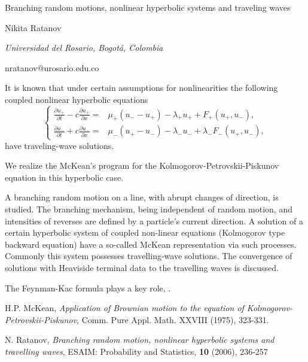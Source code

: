 \documentclass[10pt,a4paper]{article}
\begin{document}
\begin{center}

{\Large Branching random motions, nonlinear hyperbolic systems and traveling waves}

\bigskip

{\sc Nikita Ratanov}

{\small\it Universidad del Rosario, Bogot\'a, Colombia}

{\small\rm nratanov@urosario.edu.co}

\end{center}

\bigskip
It is known that under certain assumptions for nonlinearities the 
following coupled nonlinear hyperbolic equations
\[
\left\{
\begin{aligned}
\frac{\partial u_+}{\partial t}-c\frac{\partial u_+}{\partial x}
=&\mu_+(u_--u_+)-\lambda_+u_++F_+(u_+, u_-),\\
\frac{\partial u_-}{\partial t}+c\frac{\partial u_-}{\partial x}
=&\mu_-(u_+-u_-)-\lambda_-u_-+\lambda_-F_-(u_+, u_-),
\end{aligned}
\right.
\]
have traveling-wave solutions. 

We realize the McKean's program \cite{McK323} for the 
Kolmogorov-Petrovskii-Piskunov equation in this hyperbolic case. 

A branching random motion on a line, 
with abrupt changes of direction, is studied. 
The
branching mechanism, 
being independent of random motion, and intensities of reverses are defined
by a particle's current direction. 
A solution of a certain hyperbolic system of coupled non-linear
equations (Kolmogorov type backward equation)
have a so-called McKean representation via such
processes. Commonly this system possesses travelling-wave solutions. 
The convergence of solutions
with Heaviside terminal data to the travelling waves is discussed.

The Feynman-Kac formula plays a key role, \cite{ratanov}.

\begin{thebibliography}{6}

H.P. McKean,  \emph{Application of Brownian motion to the equation of Kolmogorov-Petrovskii-Piskunov}, Comm. Pure Appl. Math.
XXVIII (1975), 323-331.

N. Ratanov, \emph{Branching random motion,
nonlinear hyperbolic systems and travelling waves}, ESAIM: Probability and Statistics, 
{\bf{10}} (2006),  236-257

\end{thebibliography}
\end{document}
